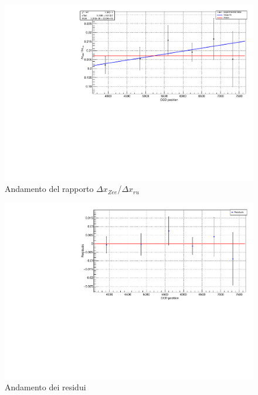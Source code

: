 \documentclass{article}
\begin{document}
	\begin{center}
		\begin{figure}[H]
			\centering
			\includegraphics[scale=0.38, angle=0]{campomin/fit.pdf}
			\caption{Andamento del rapporto $\Delta x_{Zee}$/$\Delta x_{ru}$}
			\label{fig:fit_rapporto_min}
		\end{figure}
	\end{center}

	\begin{center}
		\begin{figure}[H]
			\centering
			\includegraphics[scale=0.38, angle=0]{campomin/residuals.pdf}
			\caption{Andamento dei residui}
			\label{fig:fit_rapporto_min_res}
		\end{figure}
	\end{center}
\end{document}
